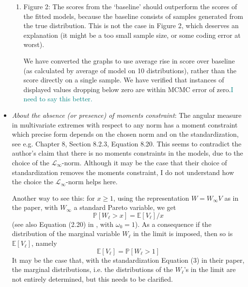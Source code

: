 \documentclass[10pt]{article}
\newcommand{\comment}[1]{\textcolor{teal}{#1}}
\begin{document}
\begin{itemize}
\begin{enumerate}

            
            \item Figure 2: The scores from the ‘baseline’ should outperform the scores of
            the fitted models, because the baseline consists of samples generated from the 
            true distribution. This is not the case in Figure 2, which deserves an explanation 
            (it might be a too small sample size, or some coding error at worst).

            We have converted the graphs to use average rise in score over baseline (as calculated
            by average of model on 10 distributions), rather than the score directly on a single
            sample. We have verified that instances of displayed values dropping below zero are 
            within MCMC error of zero.\comment{I need to say this better.}

        \end{enumerate}

    \item \emph{About the absence (or presence) of moments constraint}: The angular measure in
    multivariate extremes with respect to any norm has a moment constraint which precise form depends 
    on the chosen norm and on the standardization, see e.g. 
    \cite{beirlant2006} Chapter 8, Section 8.2.3, Equation 8.20. 
    This seems to contradict the author’s claim that there is no moments constraints in the models, 
    due to the choice of the $\mathcal{L}_{\infty}$-norm. Although it may be the case that their choice
    of standardization removes the moments constraint, I do not understand how the choice the 
    $\mathcal{L}_{\infty}$-norm helps here.

    Another way to see this: for $x \geq 1$, using the representation $W = W_{\infty}V$ as in the
    paper, with $W_{\infty}$ a standard Pareto variable, we get 
    \[\mathbb{P}\left[W_{\ell} > x\right] = \mathbb{E}\left[V_{\ell}\right] / x\]
    (see also Equation (2.20) in \cite{ferreira2014}, with $\omega_0 = 1$).  As a consequence if 
    the distribution of the marginal variable $W_{\ell}$ in the limit is imposed, then so is 
    $\mathbb{E}\left[V_{\ell}\right]$, namely 
    \[ \mathbb{E}\left[V_{\ell}\right] = \mathbb{P}\left[W_{\ell} > 1\right] \]
    It may be the case that, with the standardization Equation (3) in their paper, the marginal
    distributions, i.e. the distributions of the $W_{\ell}$’s in the limit are not entirely determined, 
    but this needs to be clarified.


\end{itemize}
\end{document}
